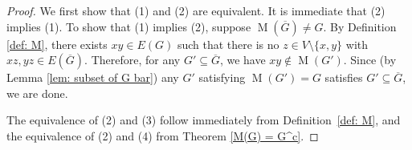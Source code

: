 \documentclass[12pt]{amsart}
\newtheorem{theorem}{Theorem}[section]
\newtheorem{corollary}[theorem]{Corollary}
\theoremstyle{definition}
\theoremstyle{remark}
\numberwithin{equation}{section}
\numberwithin{figure}{section}
\newcommand{\M}{\operatorname{M}}
\newcommand{\diam}{\operatorname{diam}}
\begin{document}
\begin{proof}
    We first show that (1) and (2) are equivalent.
    It is immediate that (2) implies (1).
    To show that (1) implies (2), suppose $\M(\overline{G}) \neq G$. 
    By Definition \ref{def: M}, there exists $xy \in E(G)$ such that there is no $z \in V \setminus \{x,y\}$ with $xz,yz \in E(\overline{G})$. 
    Therefore, for any $G'\subseteq \overline{G}$, we have $xy\not\in \M(G')$. 
    Since (by Lemma \ref{lem: subset of G bar}) any $G'$ satisfying $\M(G')=G$ satisfies $G'\subseteq \overline{G}$, we are done.

    The equivalence of (2) and (3) follow immediately from Definition~\ref{def: M}, and the equivalence of (2) and (4) from Theorem \ref{M(G) = G^c}.    
\end{proof}



\end{document}
